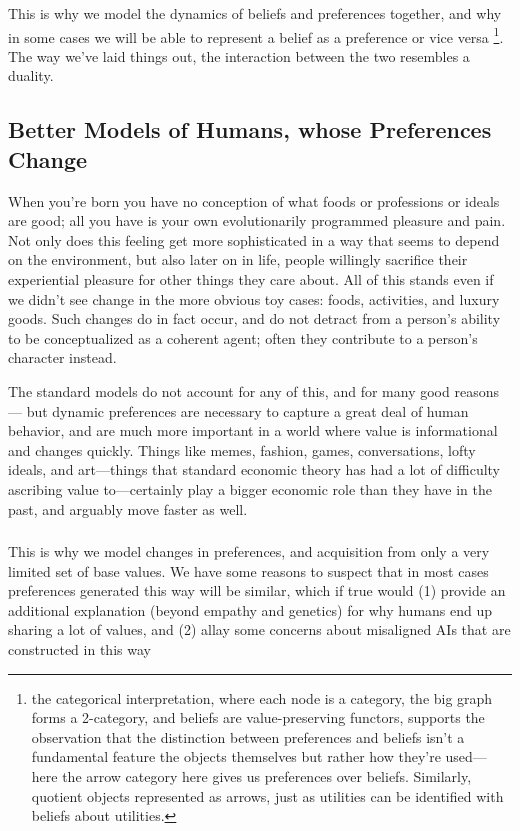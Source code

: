 \documentclass{article}
\begin{document}
	{\color{green!30!black}This is why we model the dynamics of beliefs and preferences together, and why in some cases we will be able to represent a belief as a preference or vice versa%
		\footnote{the categorical interpretation, where each node is a category, the big graph forms a 2-category, and beliefs are value-preserving functors, supports the observation that the distinction between preferences and beliefs isn't a fundamental feature the objects themselves but rather how they're used--- here the arrow category here gives us preferences over beliefs. Similarly, quotient objects represented as arrows, just as utilities can be identified with beliefs about utilities.}.
	The way we've laid things out, the interaction between the two resembles a duality.
	}
	
	\subsection{Better Models of Humans, whose Preferences Change}
	When you're born you have no conception of what foods or professions or ideals are good; all you have is your own evolutionarily programmed pleasure and pain. Not only does this feeling get more sophisticated in a way that seems to depend on the environment, but also later on in life, people willingly sacrifice their experiential pleasure for other things they care about. All of this stands even if we didn't see change in the more obvious toy cases: foods, activities, and luxury goods. Such changes do in fact occur, and do not detract from a person's ability to be conceptualized as a coherent agent; often they contribute to a person's character instead.
	
	The standard models do not account for any of this, and for many good reasons --- but dynamic preferences are necessary to capture a great deal of human behavior, and are much more important in a world where value is informational and changes quickly. Things like memes, fashion, games, conversations, lofty ideals, and art---things that standard economic theory has had a lot of difficulty ascribing value to---certainly play a bigger economic role than they have in the past, and arguably move faster as well.
	
	\subsubsection{}
	{\color{green!30!black}This is why we model changes in preferences, and acquisition from only a very limited set of base values. We have some reasons to suspect that in most cases preferences generated this way will be similar, which if true would (1) provide an additional explanation (beyond empathy and genetics) for why humans end up sharing a lot of values, and (2) allay some concerns about misaligned AIs that are constructed in this way}
	
\end{document}
